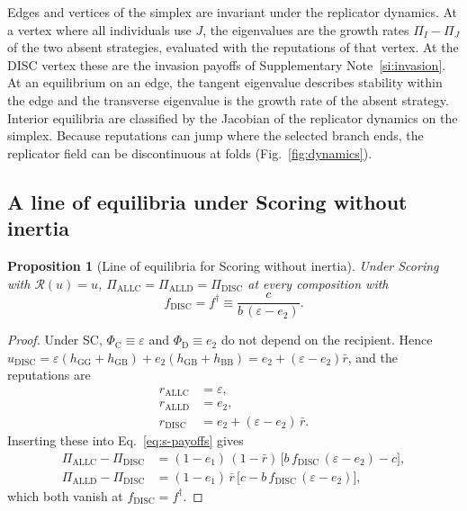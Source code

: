 \documentclass[10pt]{wlscirep}
\newcommand{\Rmap}{\mathscr{R}}            %
\newcommand{\PhiC}{\Phi_{\mathrm{C}}}
\newcommand{\PhiD}{\Phi_{\mathrm{D}}}
\newcommand{\ALLC}{\mathrm{ALLC}}
\newcommand{\ALLD}{\mathrm{ALLD}}
\newcommand{\DISC}{\mathrm{DISC}}
\theoremstyle{plain}
\newtheorem{proposition}[lemma]{Proposition}
\theoremstyle{remark}
\begin{document}
Edges and vertices of the simplex are invariant under the replicator dynamics. At a vertex where all individuals use $J$, the eigenvalues are the growth rates $\Pi_I-\Pi_J$ of the two absent strategies, evaluated with the reputations of that vertex. At the DISC vertex these are the invasion payoffs of Supplementary Note~\ref{si:invasion}. At an equilibrium on an edge, the tangent eigenvalue describes stability within the edge and the transverse eigenvalue is the growth rate of the absent strategy. Interior equilibria are classified by the Jacobian of the replicator dynamics on the simplex. Because reputations can jump where the selected branch ends, the replicator field can be discontinuous at folds (Fig.~\ref{fig:dynamics}).

\subsection{A line of equilibria under Scoring without inertia}

\begin{proposition}[Line of equilibria for Scoring without inertia]\label{prop:neutral}
Under Scoring with $\Rmap(u)=u$, $\Pi_{\ALLC}=\Pi_{\ALLD}=\Pi_{\DISC}$ at every composition with
\begin{equation}
f_{\DISC}=f^\dagger\equiv\frac{c}{b\,(\varepsilon-e_2)}.
\label{eq:s-fdagger}
\end{equation}
\end{proposition}
\begin{proof}
Under SC, $\PhiC\equiv\varepsilon$ and $\PhiD\equiv e_2$ do not depend on the recipient. Hence $u_{\DISC}=\varepsilon(h_{\mathrm{GG}}+h_{\mathrm{GB}})+e_2(h_{\mathrm{GB}}+h_{\mathrm{BB}})=e_2+(\varepsilon-e_2)\bar r$, and the reputations are
\begin{equation}
\begin{aligned}
r_{\ALLC}&=\varepsilon,\\
r_{\ALLD}&=e_2,\\
r_{\DISC}&=e_2+(\varepsilon-e_2)\,\bar r.
\end{aligned}
\label{eq:s-sc-reputations}
\end{equation}
Inserting these into Eq.~\eqref{eq:s-payoffs} gives
\begin{equation}
\begin{aligned}
\Pi_{\ALLC}-\Pi_{\DISC}&=(1-e_1)\,(1-\bar r)\,\bigl[b\,f_{\DISC}\,(\varepsilon-e_2)-c\bigr],\\
\Pi_{\ALLD}-\Pi_{\DISC}&=(1-e_1)\,\bar r\,\bigl[c-b\,f_{\DISC}\,(\varepsilon-e_2)\bigr],
\end{aligned}
\label{eq:s-sc-payoffs}
\end{equation}
which both vanish at $f_{\DISC}=f^\dagger$.
\end{proof}
\end{document}
